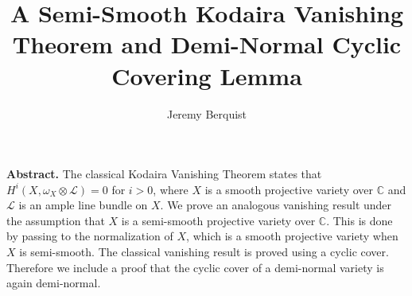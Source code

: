 \documentclass{article}
\begin{document}
\author{Jeremy Berquist}
\title{A Semi-Smooth Kodaira Vanishing Theorem and Demi-Normal Cyclic Covering Lemma}
\maketitle

\noindent
\linebreak
\textbf{Abstract.  }   The classical Kodaira Vanishing Theorem states that $H^i(X, \omega_X \otimes \mathcal{L}) = 0$ for $i>0$, where $X$ is a smooth projective variety over $\mathbb{C}$ and $\mathcal{L}$ is an ample line bundle on $X$.  We prove an analogous vanishing result under the assumption that $X$ is a semi-smooth projective variety over $\mathbb{C}$.  This is done by passing to the normalization of $X$, which is a smooth projective variety when $X$ is semi-smooth.  The classical vanishing result is proved using a cyclic cover.  Therefore we include a proof that the cyclic cover of a demi-normal variety is again demi-normal. 
\end{document}
